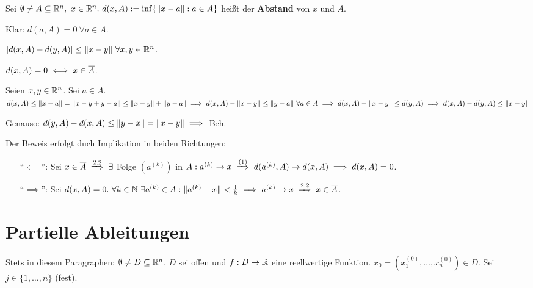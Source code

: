 \documentclass[a4paper,twoside,DIV15,BCOR12mm,chapterprefix=true,headings=twolinechapter]{scrbook}
\begin{document}
\begin{definition*}
Sei $\emptyset \ne A \subseteq \mathbb{R}^n,\ x \in \mathbb{R}^n.\ d(x,A) := \inf\{\|x-a\|:a \in A\}$ heißt der \textbf{Abstand} von $x$ und $A$.

Klar: $d(a,A) = 0\ \forall a \in A$.
\end{definition*}

\begin{satz}
\begin{liste}
\item $|d(x,A) - d(y,A)| \le \|x-y\|\ \forall x,y \in \mathbb{R}^n$.
\item $d(x,A) = 0 \iff x \in \overline{A}$.
\end{liste}
\end{satz}

\begin{beweise}
\item Seien $x,y \in \mathbb{R}^n$. Sei $a \in A$. $d(x,A) \le \|x-a\| = \|x-y+y-a\| \le \|x-y\|+\|y-a\|\\
\implies d(x,A)-\|x-y\| \le \|y-a\|\ \forall a \in A\\
\implies d(x,A) - \|x-y\| \le d(y,A)\\
\implies d(x,A) - d(y,A) \le \|x-y\|$

Genauso: $d(y,A) - d(x,A) \le \|y-x\| = \|x-y\| \implies$ Beh.
\item Der Beweis erfolgt duch Implikation in beiden Richtungen:
\begin{itemize}
\item["`$\impliedby$"':] Sei $x \in \overline{A} \folgtnach{2.2} \exists$ Folge $(a^{(k)})$ in $A: a^{(k)} \to x \folgtnach{(1)} d(a^{(k)},A) \to d(x,A) \folgt d(x,A) = 0$.
\item["`$\implies$"':] Sei $d(x,A) = 0.\ \forall k \in \MdN\ \exists a^{(k)} \in A: \|a^{(k)} - x\| < \frac{1}{k} \folgt a^{(k)} \to x \folgtnach{2.2} x \in \overline{A}$.
\end{itemize}
\end{beweise}



\chapter{Partielle Ableitungen}

Stets in diesem Paragraphen: $\emptyset\ne D\subseteq \mathbb{R}^n$, $D$ sei offen und $f:D\to\mathbb{R}$ eine reellwertige Funktion. $x_0 = (x_1^{(0)}, \ldots, x_n^{(0)}) \in D$. Sei $j\in\{1,\ldots,n\}$ (fest).
\end{document}
